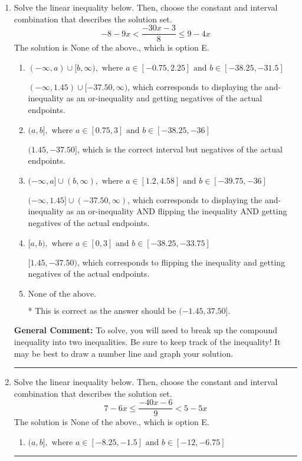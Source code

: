 \documentclass{extbook}[14pt]
\newcommand{\litem}[1]{\item #1

\rule{\textwidth}{0.4pt}}
\begin{document}
\begin{enumerate}
{\begin{enumerate}[label=\Alph*.]
 $(-\infty, 0.933)$, which corresponds to negating the endpoint of the solution.
\item \( \text{None of the above}. \)

You may have chosen this if you thought the inequality did not match the ends of the intervals.
\end{enumerate}

\textbf{General Comment:} Remember that less/greater than or equal to includes the endpoint, while less/greater do not. Also, remember that you need to flip the inequality when you multiply or divide by a negative.
}
\litem{
Solve the linear inequality below. Then, choose the constant and interval combination that describes the solution set.
\[ -8 - 9 x < \frac{-30 x - 3}{8} \leq 9 - 4 x \]The solution is \( \text{None of the above.} \), which is option E.\begin{enumerate}[label=\Alph*.]
\item \( (-\infty, a) \cup [b, \infty), \text{ where } a \in [-0.75, 2.25] \text{ and } b \in [-38.25, -31.5] \)

$(-\infty, 1.45) \cup [-37.50, \infty)$, which corresponds to displaying the and-inequality as an or-inequality and getting negatives of the actual endpoints.
\item \( (a, b], \text{ where } a \in [0.75, 3] \text{ and } b \in [-38.25, -36] \)

$(1.45, -37.50]$, which is the correct interval but negatives of the actual endpoints.
\item \( (-\infty, a] \cup (b, \infty), \text{ where } a \in [1.2, 4.58] \text{ and } b \in [-39.75, -36] \)

$(-\infty, 1.45] \cup (-37.50, \infty)$, which corresponds to displaying the and-inequality as an or-inequality AND flipping the inequality AND getting negatives of the actual endpoints.
\item \( [a, b), \text{ where } a \in [0, 3] \text{ and } b \in [-38.25, -33.75] \)

$[1.45, -37.50)$, which corresponds to flipping the inequality and getting negatives of the actual endpoints.
\item \( \text{None of the above.} \)

* This is correct as the answer should be $(-1.45, 37.50]$.
\end{enumerate}

\textbf{General Comment:} To solve, you will need to break up the compound inequality into two inequalities. Be sure to keep track of the inequality! It may be best to draw a number line and graph your solution.
}
\litem{
Solve the linear inequality below. Then, choose the constant and interval combination that describes the solution set.
\[ 7 - 6 x \leq \frac{-40 x - 6}{9} < 5 - 5 x \]The solution is \( \text{None of the above.} \), which is option E.\begin{enumerate}[label=\Alph*.]
\item \( (a, b], \text{ where } a \in [-8.25, -1.5] \text{ and } b \in [-12, -6.75] \)


\end{enumerate}}
\end{enumerate}
\end{document}
